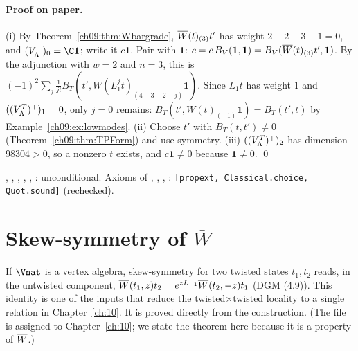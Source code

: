 \paragraph{Proof on paper.} (i) By Theorem~\ref{ch09:thm:Wbargrade}, $\overline{W}(t)_{(3)}t'$ has weight
$2+2-3-1=0$, and $(\chnineVP)_0=\C\mathbf1$; write it $c\mathbf1$. Pair with $\mathbf1$:
$c=c\,B_V(\mathbf1,\mathbf1)=B_V(\overline{W}(t)_{(3)}t',\mathbf1)$. By the adjunction with $w=2$ and $n=3$,
this is $(-1)^2\sum_j\frac1{j!}B_T(t',W(L_1^jt)_{(4-3-2-j)}\mathbf1)$. Since $L_1t$ has weight $1$ and
$((V_{\Lambda}^{T})^{+})_1=0$, only $j=0$ remains: $B_T(t',W(t)_{(-1)}\mathbf1)=B_T(t',t)$ by
Example~\ref{ch09:ex:lowmodes}. (ii) Choose $t'$ with $B_T(t,t')\neq0$ (Theorem~\ref{ch09:thm:TPForm})
and use symmetry. (iii) $((V_{\Lambda}^{T})^{+})_2$ has dimension $98304>0$, so a nonzero $t$ exists, and
$c\mathbf1\neq0$ because $\mathbf1\neq0$. \qed

\begin{status}
, , ,
, ,
: unconditional. Axioms of ,
, , :
\texttt{[propext, Classical.choice, Quot.sound]} (rechecked).
\end{status}

\section{Skew-symmetry of \texorpdfstring{$\overline{W}$}{Wbar}}\label{ch09:sec:skew}

If $\Vnat$ is a vertex algebra, skew-symmetry for two twisted states $t_1,t_2$ reads, in the
untwisted component, $\overline{W}(t_1,z)t_2=e^{zL_{-1}}\overline{W}(t_2,-z)t_1$ (DGM (4.9)). This identity is
one of the inputs that reduce the twisted$\times$twisted locality to a single relation in
Chapter~\ref{ch:10}. It is proved directly from the construction. (The file
 is assigned to Chapter~\ref{ch:10}; we state the theorem here
because it is a property of $\overline{W}$.)

